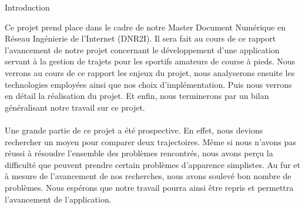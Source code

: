 {\Huge{Introduction}}

\vspace{2cm}
Ce projet prend place dans le cadre de notre Master Document Numérique en Réseau Ingénierie de l'Internet (DNR2I). Il sera fait au cours de ce rapport l'avancement de notre projet concernant le développement d'une application servant à la gestion de trajets pour les sportifs amateurs de course à pieds. Nous verrons au cours de ce rapport les enjeux du projet, nous analyserons ensuite les technologies employées ainsi que nos choix d'implémentation. Puis nous verrons en détail la réalisation du projet. Et enfin, nous terminerons par un bilan généralisant notre travail sur ce projet.
\paragraph{}
Une grande partie de ce projet a été prospective. En effet, nous devions rechercher un moyen pour comparer deux trajectoires. Même si nous n'avons pas réussi à résoudre l'ensemble des problèmes rencontrés, nous avons perçu la difficulté que peuvent prendre certain problèmes d'apparence simplistes. Au fur et à mesure de l'avancement de nos recherches, nous avons soulevé bon nombre de problèmes. Nous espérons que notre travail pourra ainsi être repris et permettra l'avancement de l'application.